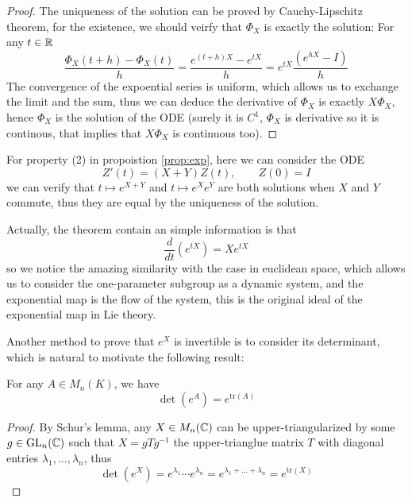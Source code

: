 \begin{proof}
    The uniqueness of the solution can be proved by Cauchy-Lipschitz theorem, for the existence, we should veirfy that \(\Phi_X\) is exactly the solution: For any \(t \in \mathbb{R}\)
    \[\frac{\Phi_X(t+h)-\Phi_X(t)}{h} = \frac{e^{(t+h)X} - e^{tX}}{h} = e^{tX}\frac{(e^{hX} - I)}{h}\]
    The convergence of the expoential series is uniform, which allows us to exchange the limit and the sum, thus we can deduce the derivative of \(\Phi_X\) is exactly \(X\Phi_X\), hence \(\Phi_X\) is the solution of the ODE (surely it is \(C^1\), \(\Phi_X\) is derivative so it is continous, that implies that \(X\Phi_X\) is continuous too).
\end{proof}

\begin{remark}
    For property (2) in propoistion \ref{prop:exp}, here we can consider the ODE
    \[Z'(t) = (X+Y)Z(t), \qquad Z(0) = I\]
    we can verify that \(t \mapsto e^{X+Y}\) and \(t \mapsto e^{X}e^{Y}\) are both solutions when \(X\) and \(Y\) commute, thus they are equal by the uniqueness of the solution.
\end{remark}

\begin{remark}
    Actually, the theorem contain an simple information is that
    \[\frac{d}{dt}(e^{tX}) = Xe^{tX}\]
    so we notice the amazing similarity with the case in euclidean space, which allows us to consider the one-parameter subgroup as a dynamic system, and the exponential map is the flow of the system, this is the original ideal of the exponential map in Lie theory.
\end{remark}

Another method to prove that \(e^X\) is invertible is to consider its determinant, which is natural to motivate the following result:

\begin{colortheorem}
    For any \(A \in M_n(K)\), we have
    \[\det(e^A) = e^{\mathrm{tr}(A)}\]
    
\end{colortheorem}
\begin{proof}
    By Schur's lemma, any \(X \in M_n(\mathbb{C})\) can be upper-triangularized by some \(g \in \mathrm{GL}_n(\mathbb{C})\) such that \(X = gTg^{-1}\) the upper-trianglue matrix \(T\) with diagonal entries \(\lambda_1,...,\lambda_n\), thus
    \[\det (e^X) = e^{\lambda_1}\cdots e^{\lambda_n} =  e^{\lambda_1+\dots+\lambda_n} = e^{\mathrm{tr}(X)}\]
\end{proof}


